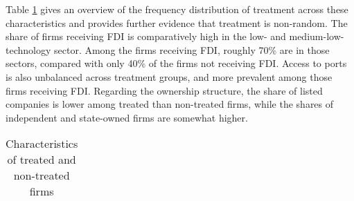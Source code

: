 Table \ref{treatment_char} gives an overview of the frequency distribution of treatment across these characteristics and provides further evidence that treatment is non-random. The share of firms receiving FDI is comparatively high in the low- and medium-low-technology sector. Among the firms receiving FDI, roughly 70\% are in those sectors, compared with only 40\% of the firms not receiving FDI. Access to ports is also unbalanced across treatment groups, and more prevalent among those firms receiving FDI. Regarding the ownership structure, the share of listed companies is lower among treated than non-treated firms, while the shares of independent and state-owned firms are somewhat higher.  \\ \par


\begin{centering}
\begin{table}[htbp]\centering \caption{Characteristics of treated and non-treated firms\label{treatment_char}}
\begin{tabular}[htbp!]{lrrrrrrrrrr}
\hline\hline

\hline\hline
\end{tabular} 
 \end{table}
 \end{centering}
 
